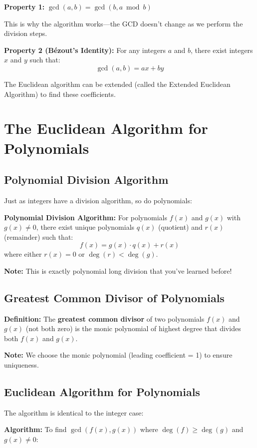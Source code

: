 \documentclass[12pt]{article}
\begin{document}
\textbf{Property 1:} $\gcd(a, b) = \gcd(b, a \bmod b)$

This is why the algorithm works—the GCD doesn't change as we perform the division steps.

\textbf{Property 2 (Bézout's Identity):} For any integers $a$ and $b$, there exist integers $x$ and $y$ such that:
$$\gcd(a, b) = ax + by$$

The Euclidean algorithm can be extended (called the Extended Euclidean Algorithm) to find these coefficients.

\section{The Euclidean Algorithm for Polynomials}

\subsection{Polynomial Division Algorithm}

Just as integers have a division algorithm, so do polynomials:

\textbf{Polynomial Division Algorithm:} For polynomials $f(x)$ and $g(x)$ with $g(x) \neq 0$, there exist unique polynomials $q(x)$ (quotient) and $r(x)$ (remainder) such that:
$$f(x) = g(x) \cdot q(x) + r(x)$$
where either $r(x) = 0$ or $\deg(r) < \deg(g)$.

\textbf{Note:} This is exactly polynomial long division that you've learned before!

\subsection{Greatest Common Divisor of Polynomials}

\textbf{Definition:} The \textbf{greatest common divisor} of two polynomials $f(x)$ and $g(x)$ (not both zero) is the monic polynomial of highest degree that divides both $f(x)$ and $g(x)$.

\textbf{Note:} We choose the monic polynomial (leading coefficient = 1) to ensure uniqueness.

\subsection{Euclidean Algorithm for Polynomials}

The algorithm is identical to the integer case:

\textbf{Algorithm:} To find $\gcd(f(x), g(x))$ where $\deg(f) \geq \deg(g)$ and $g(x) \neq 0$:
\end{document}
